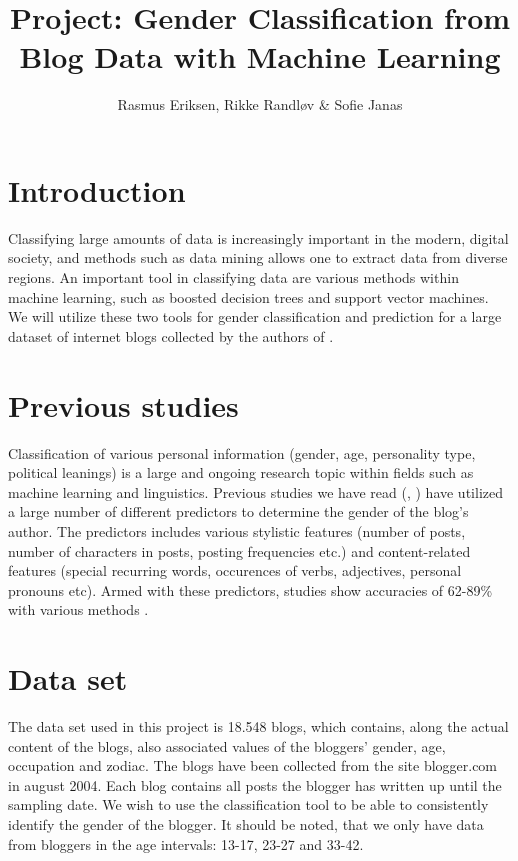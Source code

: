 \documentclass[a4paper,11pt]{article}
\begin{document}
\title{Project: Gender Classification from Blog Data with Machine Learning}
\author{Rasmus Eriksen, Rikke Randl\o v \& Sofie Janas}
\maketitle
\tableofcontents
\newpage
{}
\section{Introduction}
Classifying large amounts of data is increasingly important in the modern, digital society, and methods such as data mining allows one to extract data from diverse regions. An important tool in classifying data are various methods within machine learning, such as boosted decision trees and support vector machines. We will utilize these two tools for gender classification and prediction for a large dataset of internet blogs collected by the authors of \cite{data}.

\section{Previous studies}
Classification of various personal information (gender, age, personality type, political leanings) is a large and ongoing research topic within fields such as machine learning and linguistics. Previous studies we have read (\cite{data}, \cite{other}) have utilized a large number of different predictors to determine the gender of the blog's author. The predictors includes various stylistic features (number of posts, number of characters in posts, posting frequencies etc.) and content-related features (special recurring words, occurences of verbs, adjectives, personal pronouns etc). Armed with these predictors, studies show accuracies of  62-89\% with various methods \cite{other}.

\section{Data set}
\label{sec:data}
The data set used in this project is 18.548 blogs, which contains, along the actual content of the blogs, also associated values of the bloggers' gender, age, occupation and zodiac. The blogs have been collected from the site blogger.com in august 2004. Each blog contains all posts the blogger has written up until the sampling date. We wish to use the classification tool to be able to consistently identify the gender of the blogger. It should be noted, that we only have data from bloggers in the age intervals: 13-17, 23-27 and 33-42.\\
\end{document}
